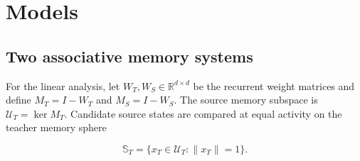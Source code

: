 \documentclass[10pt,letterpaper]{article}
\theoremstyle{plain}
\theoremstyle{remark}
\begin{document}

\section{Models}


\subsection{Two associative memory systems}


For the linear analysis, let $W_T,W_S\in\mathbb R^{d\times d}$ be the recurrent weight matrices and define $M_T=I-W_T$ and $M_S=I-W_S$. The source memory subspace is $\mathcal U_T=\ker M_T$. Candidate source states are compared at equal activity on the teacher memory sphere

\begin{equation}
\mathbb S_T=\{x_T\in\mathcal U_T:\|x_T\|=1\}.
\label{eq:teacher-sphere}
\end{equation}

\end{document}

